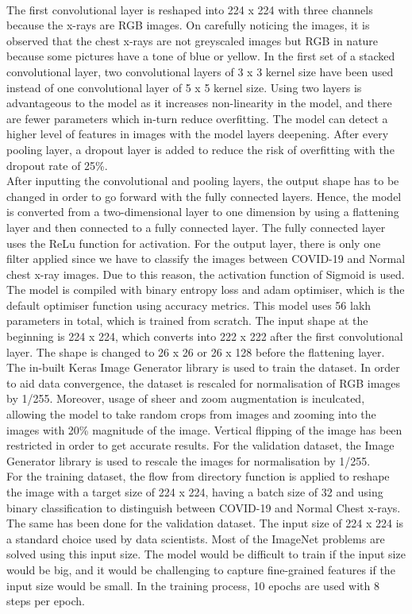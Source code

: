 \documentclass[12pt]{revtex4}
\begin{document}
\\The first convolutional layer is reshaped into 224 x 224 with three channels because the x-rays are RGB images. On carefully noticing the images, it is observed that the chest x-rays are not greyscaled images but RGB in nature because some pictures have a tone of blue or yellow. In the first set of a stacked convolutional layer, two convolutional layers of 3 x 3 kernel size have been used instead of one convolutional layer of 5 x 5 kernel size. Using two layers is advantageous to the model as it increases non-linearity in the model, and there are fewer parameters which in-turn reduce overfitting. The model can detect a higher level of features in images with the model layers deepening. After every pooling layer, a dropout layer is added to reduce the risk of overfitting with the dropout rate of 25\%.
\\After inputting the convolutional and pooling layers, the output shape has to be changed in order to go forward with the fully connected layers. Hence, the model is converted from a two-dimensional layer to one dimension by using a flattening layer and then connected to a fully connected layer. The fully connected layer uses the ReLu function for activation. For the output layer, there is only one filter applied since we have to classify the images between COVID-19 and Normal chest x-ray images. Due to this reason, the activation function of Sigmoid is used. 
\\The model is compiled with binary entropy loss and adam optimiser, which is the default optimiser function using accuracy metrics. This model uses 56 lakh parameters in total, which is trained from scratch. The input shape at the beginning is 224 x 224, which converts into 222 x 222 after the first convolutional layer. The shape is changed to 26 x 26 or 26 x 128 before the flattening layer. 
\\The in-built Keras Image Generator library is used to train the dataset. In order to aid data convergence, the dataset is rescaled for normalisation of RGB images by 1/255. Moreover, usage of sheer and zoom augmentation is inculcated, allowing the model to take random crops from images and zooming into the images with 20\% magnitude of the image.  Vertical flipping of the image has been restricted in order to get accurate results. For the validation dataset, the Image Generator library is used to rescale the images for normalisation by 1/255. 
\\For the training dataset, the flow from directory function is applied to reshape the image with a target size of 224 x 224, having a batch size of 32 and using binary classification to distinguish between COVID-19 and Normal Chest x-rays. The same has been done for the validation dataset. The input size of 224 x 224 is a standard choice used by data scientists. Most of the ImageNet problems are solved using this input size. The model would be difficult to train if the input size would be big, and it would be challenging to capture fine-grained features if the input size would be small. In the training process, 10 epochs are used with 8 steps per epoch.  
\end{document}
